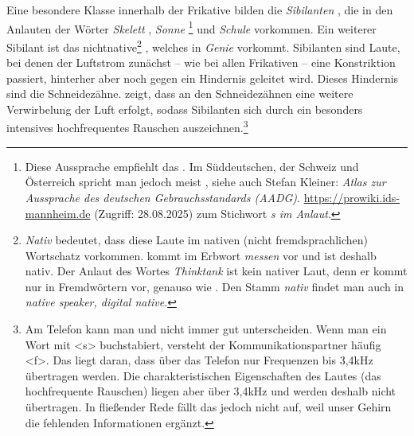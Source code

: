 Eine besondere Klasse innerhalb der Frikative bilden die \textit{Sibilanten} \textipa{[s, z, S]}, die in den Anlauten der Wörter \textit{Skelett} , \textit{Sonne} \textipa{[\textprimstress zO\.*{n}@]}\footnote{Diese Aussprache empfiehlt das \citet[139]{DudenZweifelsfaelle2021}. Im Süddeutschen, der Schweiz und Österreich spricht man jedoch meist \textipa{[\textprimstress sO\.*{n}@]} \citep[74]{DudenAussprache2023}, siehe auch Stefan Kleiner: \textit{Atlas zur Aussprache des deutschen Gebrauchsstandards (AADG)}. \url{https://prowiki.ids-mannheim.de} (Zugriff: 28.08.2025) zum Stichwort \textit{s im Anlaut}.} und \textit{Schule} \textipa{[\textprimstress Su:.l@]} vorkommen. Ein weiterer Sibilant ist das  nichtnative\footnote{\textit{Nativ} bedeutet, dass diese Laute im nativen (nicht fremdsprachlichen) Wortschatz vorkommen. \textipa{[s]} kommt \zB im Erbwort \textit{messen} vor und ist deshalb nativ. Der Anlaut des Wortes \textit{Thinktank} \textipa{[\texttheta]} ist kein nativer Laut, denn er kommt nur in Fremdwörtern vor, genauso wie \textipa{[Z]}. Den Stamm \textit{nativ} findet man auch in \textit{native speaker, digital native}.}  \textipa{[Z]}, welches in  \textit{Genie} \textipa{[Ze\textprimstress ni:]} vorkommt. Sibilanten sind Laute, bei denen der Luftstrom zunächst -- wie bei allen Frikativen -- eine Konstriktion passiert, hinterher aber noch gegen ein Hindernis geleitet wird. Dieses Hindernis sind die Schneidezähne. \citet{Shadle1991} zeigt, dass an den Schneidezähnen eine weitere Verwirbelung der Luft erfolgt, sodass Sibilanten sich durch ein besonders intensives hochfrequentes Rauschen auszeichnen.\footnote{Am Telefon kann man \textipa{[s]} und \textipa{[f]} nicht immer gut unterscheiden. Wenn man ein Wort mit <s> buchstabiert, versteht der Kommunikationspartner häufig <f>. Das liegt daran, dass über das Telefon nur Frequenzen bis 3,4kHz übertragen werden. Die charakteristischen Eigenschaften des Lautes \textipa{[s]} (das hochfrequente Rauschen) liegen aber über 3,4kHz und werden deshalb nicht übertragen. In fließender Rede fällt das jedoch nicht auf, weil unser Gehirn die fehlenden Informationen ergänzt.}


